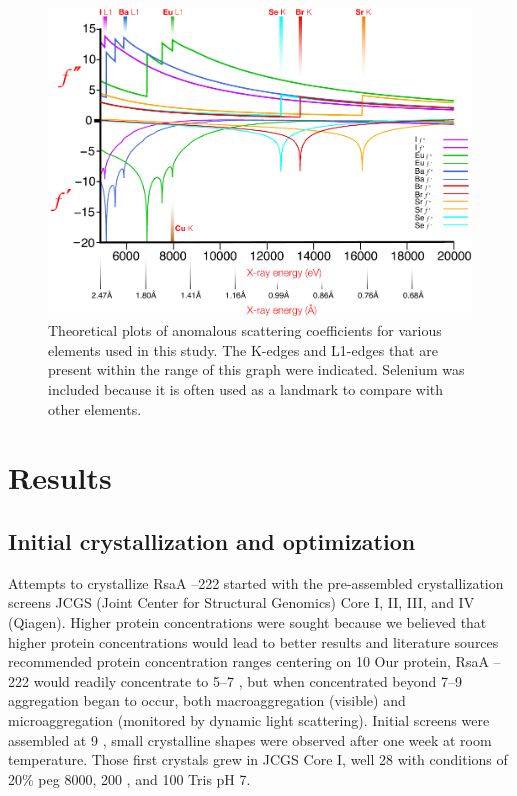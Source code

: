 \begin{figure}[htb]
  	\begin{center}
   		\includegraphics[width=\textwidth]{crystal_chapter/img/edgeplots.pdf}
   	\end{center}
   	\caption[Edge plots for useful anomalous dispersion elements]{
   	Theoretical plots of anomalous scattering coefficients for various elements used in this study. The K-edges and L1-edges that are present within the range of this graph were indicated. Selenium was included because it is often used as a landmark to compare with other elements.}
   	\label{fig:edges}
\end{figure}    

\section{Results}\label{sec:crystal-results}

\subsection{Initial crystallization and optimization}\label{sec:init-cryst-optim} 
 Attempts to crystallize RsaA --222 started with the pre-assembled crystallization screens JCGS (Joint Center for Structural Genomics) Core I, II, III, and IV (Qiagen). Higher protein concentrations were sought because we believed that higher protein concentrations would lead to better results and literature sources recommended protein concentration ranges centering on 10 \mgperml{} Our protein, RsaA --222 would readily concentrate to 5--7 \mgperml, but when concentrated beyond 7--9 \mgperml aggregation began to occur, both macroaggregation (visible) and microaggregation (monitored by dynamic light scattering). Initial screens were assembled at 9 \mgperml, small crystalline shapes were observed after one week at room temperature. Those first crystals grew in JCGS Core I, well 28 with conditions of 20\% \ac{peg} 8000, 200 \millimolar {}, and 100 \millimolar Tris pH 7.
 
